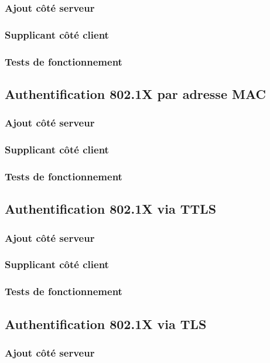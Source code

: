 		\subsubsection{Ajout côté serveur}
		\subsubsection{Supplicant côté client}
		\subsubsection{Tests de fonctionnement}
	\subsection{Authentification 802.1X par adresse MAC}
		\subsubsection{Ajout côté serveur}
		\subsubsection{Supplicant côté client}
		\subsubsection{Tests de fonctionnement}
	\subsection{Authentification 802.1X via TTLS}
		\subsubsection{Ajout côté serveur}
		\subsubsection{Supplicant côté client}
		\subsubsection{Tests de fonctionnement}
	\subsection{Authentification 802.1X via TLS}
		\subsubsection{Ajout côté serveur}

